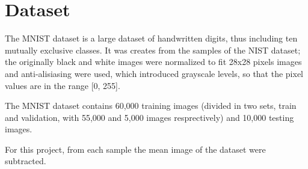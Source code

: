 \section{Dataset}

The MNIST dataset is a large dataset of handwritten digits, thus including ten mutually exclusive classes. It was creates from the samples of the NIST dataset; the originally black and white images were normalized to fit 28x28 pixels images and anti-alisiasing were used, which introduced grayscale levels, so that the pixel values are in the range [0, 255].

The MNIST dataset contains 60,000 training images (divided in two sets, train and validation, with 55,000 and 5,000 images resprectively) and 10,000 testing images.

For this project, from each sample the mean image of the dataset were subtracted.